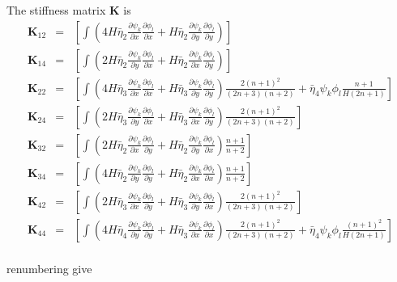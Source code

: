 \documentclass{amsart}
\newcommand{\diff}[2]{\ensuremath{\frac{\partial #1}{\partial #2}}}
\begin{document}
The stiffness matrix $\mathbf{K}$ is
\begin{equation*}
  \begin{array}{rcl}
    \mathbf{K}_{12} & = &\left[\int \left( 4 H \bar\eta_2 \diff{\psi_k}{x}\diff{\phi_l}{x} + H \bar\eta_2 \diff{\psi_k}{y}\diff{\phi_l}{y}\right) \right] \\
    \mathbf{K}_{14} & = &\left[\int \left( 2 H \bar\eta_2 \diff{\psi_k}{y}\diff{\phi_l}{x} + H \bar\eta_2 \diff{\psi_k}{x}\diff{\phi_l}{y}\right) \right] \\
    \mathbf{K}_{22} & = &\left[\int \left( 4 H \bar\eta_3 \diff{\psi_k}{x}\diff{\phi_l}{x} + H \bar\eta_3 \diff{\psi_k}{y}\diff{\phi_l}{y}\right) \frac{2(n+1)^2}{(2n+3)(n+2)} + \bar \eta_4 \psi_k \phi_l \frac{n+1}{H(2n+1)} \right] \\
    \mathbf{K}_{24} & = &\left[\int \left( 2 H \bar\eta_3 \diff{\psi_k}{y}\diff{\phi_l}{x} + H \bar\eta_3 \diff{\psi_k}{x}\diff{\phi_l}{y}\right) \frac{2(n+1)^2}{(2n+3)(n+2)} \right] \\
    \mathbf{K}_{32} & = &\left[\int \left( 2 H \bar\eta_2 \diff{\psi_k}{x}\diff{\phi_l}{y} + H \bar\eta_2 \diff{\psi_k}{y}\diff{\phi_l}{x}\right) \frac{n+1}{n+2} \right] \\
    \mathbf{K}_{34} & = &\left[\int \left( 4 H \bar\eta_2 \diff{\psi_k}{y}\diff{\phi_l}{y} + H \bar\eta_2 \diff{\psi_k}{x}\diff{\phi_l}{x}\right) \frac{n+1}{n+2} \right] \\
    \mathbf{K}_{42} & = &\left[\int \left( 2 H \bar\eta_3 \diff{\psi_k}{x}\diff{\phi_l}{y} + H \bar\eta_3 \diff{\psi_k}{y}\diff{\phi_l}{x}\right) \frac{2(n+1)^2}{(2n+3)(n+2)}  \right] \\
    \mathbf{K}_{44} & = &\left[\int \left( 4 H \bar\eta_4 \diff{\psi_k}{y}\diff{\phi_l}{y} + H \bar\eta_3 \diff{\psi_k}{x}\diff{\phi_l}{x}\right) \frac{2(n+1)^2}{(2n+3)(n+2)} + \bar \eta_4 \psi_k \phi_l \frac{(n+1)^2}{H(2n+1)} \right] \\
  \end{array}
\end{equation*}

renumbering give
\end{document}
